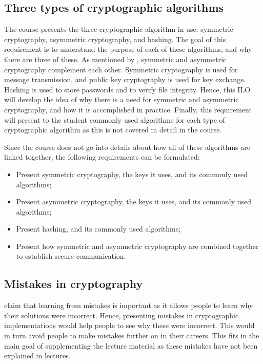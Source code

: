 \documentclass{l4proj}
\begin{document}
\subsection{Three types of cryptographic algorithms}

The course presents the three cryptographic algorithm in use: symmetric cryptography,
asymmetric cryptography, and hashing. 
The goal of this requirement is to understand the purpose of each of these algorithms,
and why there are three of these. As mentioned by \citet{kessler_overview_2016},
symmetric and asymmetric cryptography complement each other. 
Symmetric cryptography is used for message transmission, and public key cryptography 
is used for key exchange. Hashing is used to store passwords and to verify file integrity.
Hence, this ILO will develop the idea of why there is a need for symmetric and asymmetric
cryptography, and how it is accomplished in practice.
Finally, this requirement will present to the student commonly used algorithms for each
type of cryptographic algorithm as this is not covered in detail in the course.

Since the course does not go into details about how all of these algorithms are 
linked together, the following requirements can be formulated:
\begin{itemize}
    \item Present symmetric cryptography, the keys it uses, and its commonly used algorithms;
    \item Present asymmetric cryptography, the keys it uses, and its commonly used algorithms;
    \item Present hashing, and its commonly used algorithms;
    \item Present how symmetric and asymmetric cryptography are combined together
    to establish secure communication.
\end{itemize}

\subsection{Mistakes in cryptography}

\citet{eggleton_value_2001} claim that learning from mistakes is important as it allows people to 
learn why their solutions were incorrect. Hence, presenting mistakes in 
cryptographic implementations would help people to see why these were incorrect.
This would in turn avoid people to make mistakes further on in their careers.
This fits in the main goal of supplementing the lecture material as these mistakes 
have not been explained in lectures.
\end{document}
